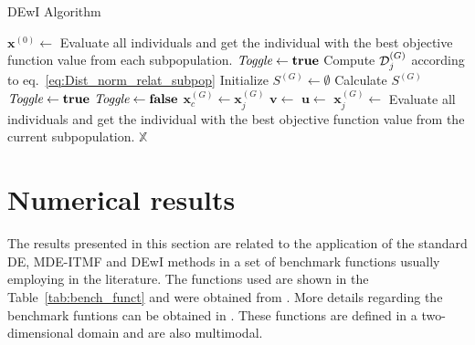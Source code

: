 \documentclass[smallextended]{svjour3}       %
\begin{document}
\begin{algorithm}[!h]
\caption{DEwI Algorithm} \label{alg:funcao_principal}
\begin{algorithmic}[1]
\State $ \boldsymbol{x}^{\left(0\right)} \leftarrow $  %
\State Evaluate all individuals and get the individual with the best objective function value from each subpopulation.
\State $ \emph{Toggle} \leftarrow \textbf{true} $
\State Compute $ {\cal{D}}_j ^{(G)} $ according to eq.~\ref{eq:Dist_norm_relat_subpop} 
\State Initialize $ S^{(G)} \leftarrow \emptyset $ 
\State Calculate $ S^{(G)} $ 
\EndIf
\EndFor
\State $ \emph{Toggle} \leftarrow \textbf{true} $
\Else
\State $ \emph{Toggle} \leftarrow \textbf{false} $
\EndIf
\State $ \boldsymbol{x}_{c}^{\left(G\right)} \leftarrow \boldsymbol{x}_{j}^{\left(G\right)} $
\State $ \boldsymbol{v} \leftarrow $  %
\State $ \boldsymbol{u} \leftarrow $  
\State $ \boldsymbol{x}_{j}^{\left(G\right)} \leftarrow $ 
\State Evaluate all individuals and get the individual with the best objective function value from the current subpopulation.
\EndIf
\EndFor
\EndFor
\State \Return $ \mathbb{X} $
\EndFunction
\end{algorithmic}
\end{algorithm}

\section{Numerical results} \label{sec:results}

The results presented in this section are related to the application of the standard DE, MDE-ITMF and DEwI methods in a set of benchmark functions usually employing in the literature. The functions used are shown in the Table~\ref{tab:bench_funct} and were obtained from \cite{bib:jamil2013literature}. More details regarding the benchmark funtions can be obtained in \cite{bib:jamil2013literature}. These functions are defined in a two-dimensional domain and are also multimodal.
\end{document}
